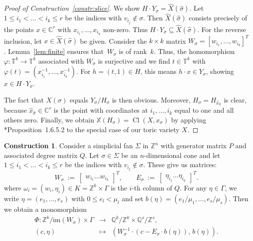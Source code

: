 \documentclass{amsart}
\newcommand{\C}{\mathbb{C}}
\newcommand{\Q}{\mathbb{Q}}
\newcommand{\Z}{\mathbb{Z}}
\newcommand{\T}{\mathbb{T}}
\DeclareMathOperator{\Cl}{Cl}
\theoremstyle{plain}
\theoremstyle{definition}
\newtheorem{construction}[theorem]{Construction}
\begin{document}
\begin{proof}[Proof of Construction~\ref{constr:slice}]
We show $H \cdot Y_\sigma = \hat X(\hat\sigma)$.
Let $1 \le i_1 < \ldots < i_k \le r$ be the
indices with $v_{i_j} \not \in \sigma$.
Then $\hat X(\hat\sigma)$ consists precisely of
the points $x \in \C^r$ with $x_{i_1}, \ldots, x_{i_k}$
non-zero.
Thus $H \cdot Y_\sigma \subseteq \hat X(\hat\sigma)$.
For the reverse inclusion, let $x \in \hat X(\hat\sigma)$
be given.
Consider the $k \times k$ matrix
$W_\sigma = [w_{i_1}, \ldots, w_{i_k}]^T$.
Lemma~\ref{lem:finite} ensures that~$W_\sigma$ is of 
rank~$k$.
Thus, the homomorphism
$\varphi \colon \T^k \to \T^k$ associated
with $W_\sigma$ is surjective
and we find $t \in \T^k $ with
$\varphi(t) = (x_{i_1}^{-1}, \ldots, x_{i_k}^{-1})$.
For $h = (t,1) \in H$, this means
$h \cdot x \in Y_\sigma$, showing $x \in H \cdot Y_\sigma$.

The fact that $X(\sigma)$ equals $Y_\sigma / H_\sigma$
is then obvious.
Moreover, $H_\sigma = H_{\hat x_{\hat \sigma}}$ is
clear, because $\hat x_{\hat \sigma} \in \C^r$ is the
point with coordinates at $i_1, \ldots, i_k$ equal
to one and all others zero.
Finally, we obtain $\mathbb{X}(H_\sigma) = \Cl(X,x_\sigma)$
by applying \cite{ADHL}*{Proposition~1.6.5.2} to the special
case of our toric variety $X$.
\end{proof}

\begin{construction}\label{constr:ev1}
Consider a simplicial fan $\Sigma$ in $\Z^n$ with generator
matrix $P$ and associated degree matrix $Q$.
Let $\sigma \in \Sigma$ be an $n$-dimensional cone
and let $1 \le i_1 < \ldots < i_k \le r$ be the
indices with $v_{i_j} \not \in \sigma$. These give
us matrices:
$$
W_\sigma \ := \ \begin{bmatrix} w_{i_1} \ldots w_{i_k} \end{bmatrix}^T,
\qquad
E_\sigma \ := \ \begin{bmatrix} \eta_{i_1} \ldots \eta_{i_k} \end{bmatrix}^T.
$$
where $\omega_i = (w_i,\eta_i) \in K = \Z^k \times \Gamma$ is the $i$-th column
of $Q$. For any $\eta \in \Gamma$, we write $\eta = (e_1, \ldots, e_s)$
with $0 \le e_l <  \mu_l$ and set $b(\eta) = (e_1/\mu_1,\ldots,e_s/\mu_s)$.
Then we obtain a monomorphism
$$
\begin{array}{rcl}
\Phi \colon \Z^k/\mathrm{im}(W_\sigma) \times \Gamma & \to & \Q^k/\Z^k \times \Q^s/\Z^s,
\\[5pt]                                                     
(c,\eta) & \mapsto & \left(W_\sigma^{-1} \cdot (c-E_\sigma \cdot b(\eta)), \, b(\eta) \right).
\end{array}
$$
\end{construction}
\end{document}
